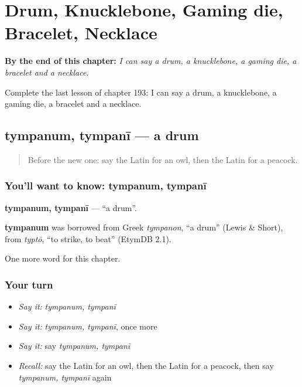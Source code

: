 
\chapter{Drum, Knucklebone, Gaming die, Bracelet, Necklace}
\label{ch:la-drum-knucklebone-gaming-die-bracelet-necklace}

\begin{chapteropening}
\textbf{By the end of this chapter:} \emph{I can say a drum, a knucklebone, a gaming die, a bracelet and a necklace.}

Complete the last lesson of chapter 193: I can say a drum, a knucklebone, a gaming die, a bracelet and a necklace.
\end{chapteropening}

\section[tympanum, tympanī]{tympanum, tympanī — a drum}

\label{lesson:LA-C193-tympanum}



\begin{quote}
Before the new one: say the Latin for an owl, then the Latin for a peacock.
\end{quote}

\subsection*{You'll want to know: tympanum, tympanī}
\textbf{tympanum, tympanī} — \textquotedblleft{}a drum\textquotedblright{}.

\begin{cousinweb}
\textbf{tympanum} was borrowed from Greek \emph{tympanon}, \textquotedblleft{}a drum\textquotedblright{} (Lewis \& Short), from \emph{typtō}, \textquotedblleft{}to strike, to beat\textquotedblright{} (EtymDB 2.1).
\end{cousinweb}

\begin{grammarlens}[title={What you've built}]
One more word for this chapter.
\end{grammarlens}

\subsection*{Your turn}
\begin{itemize}
\raggedright
  \item \emph{Say it:} \emph{tympanum, tympanī}
  \item \emph{Say it:} \emph{tympanum, tympanī}, once more
  \item \emph{Say it:} say \emph{tympanum, tympanī}
  \item \emph{Recall:} say the Latin for an owl, then the Latin for a peacock, then say \emph{tympanum, tympanī} again
\end{itemize}


